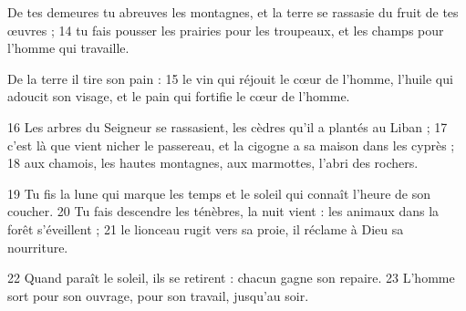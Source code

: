 De tes demeures tu abreuves les montagnes,
et la terre se rassasie du fruit de tes œuvres ;
14 tu fais pousser les prairies pour les troupeaux,
et les champs pour l'homme qui travaille.

De la terre il tire son pain :
15 le vin qui réjouit le cœur de l'homme,
l'huile qui adoucit son visage,
et le pain qui fortifie le cœur de l'homme.

16 Les arbres du Seigneur se rassasient,
les cèdres qu'il a plantés au Liban ;
17 c'est là que vient nicher le passereau,
et la cigogne a sa maison dans les cyprès ;
18 aux chamois, les hautes montagnes,
aux marmottes, l'abri des rochers.

19 Tu fis la lune qui marque les temps
et le soleil qui connaît l'heure de son coucher.
20 Tu fais descendre les ténèbres, la nuit vient :
les animaux dans la forêt s'éveillent ;
21 le lionceau rugit vers sa proie,
il réclame à Dieu sa nourriture.

22 Quand paraît le soleil, ils se retirent :
chacun gagne son repaire.
23 L'homme sort pour son ouvrage,
pour son travail, jusqu'au soir.
